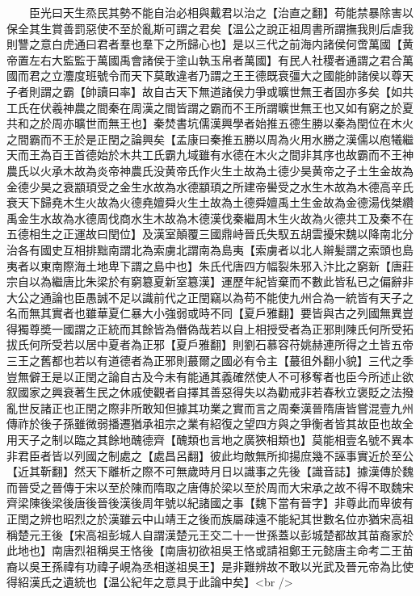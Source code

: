 　　臣光曰天生烝民其勢不能自治必相與戴君以治之【治直之翻】苟能禁暴除害以保全其生賞善罰惡使不至於亂斯可謂之君矣【温公之說正祖周書所謂撫我則后虐我則讐之意白虎通曰君者羣也羣下之所歸心也】是以三代之前海内諸侯何啻萬國【黄帝置左右大監監于萬國禹會諸侯于塗山執玉帛者萬國】有民人社稷者通謂之君合萬國而君之立灋度班號令而天下莫敢違者乃謂之王王德既衰彊大之國能帥諸侯以尊天子者則謂之霸【帥讀曰率】故自古天下無道諸侯力爭或曠世無王者固亦多矣【如共工氏在伏羲神農之間秦在周漢之間皆謂之霸而不王所謂曠世無王也又如有窮之於夏共和之於周亦曠世而無王也】秦焚書坑儒漢興學者始推五德生勝以秦為閏位在木火之間霸而不王於是正閏之論興矣【孟康曰秦推五勝以周為火用水勝之漢儒以庖犧繼天而王為百王首德始於木共工氏霸九域雖有水德在木火之間非其序也故霸而不王神農氏以火承木故為炎帝神農氏没黄帝氏作火生土故為土德少昊黄帝之子土生金故為金德少昊之衰顓頊受之金生水故為水德顓頊之所建帝嚳受之水生木故為木德高辛氏衰天下歸堯木生火故為火德堯嬗舜火生土故為土德舜嬗禹土生金故為金德湯伐桀纘禹金生水故為水德周伐商水生木故為木德漢伐秦繼周木生火故為火德共工及秦不在五德相生之正運故曰閏位】及漢室顛覆三國鼎峙晉氏失馭五胡雲擾宋魏以降南北分治各有國史互相排黜南謂北為索虜北謂南為島夷【索虜者以北人辮髪謂之索頭也島夷者以東南際海土地卑下謂之島中也】朱氏代唐四方幅裂朱邪入汴比之窮新【唐莊宗自以為繼唐比朱梁於有窮簒夏新室簒漢】運歷年紀皆棄而不數此皆私已之偏辭非大公之通論也臣愚誠不足以識前代之正閏竊以為苟不能使九州合為一統皆有天子之名而無其實者也雖華夏仁暴大小強弱或時不同【夏戶雅翻】要皆與古之列國無異豈得獨尊奬一國謂之正統而其餘皆為僭偽哉若以自上相授受者為正邪則陳氏何所受拓拔氏何所受若以居中夏者為正邪【夏戶雅翻】則劉石慕容苻姚赫連所得之土皆五帝三王之舊都也若以有道德者為正邪則蕞爾之國必有令主【蕞徂外翻小貌】三代之季豈無僻王是以正閏之論自古及今未有能通其義確然使人不可移奪者也臣今所述止欲叙國家之興衰著生民之休戚使觀者自擇其善惡得失以為勸戒非若春秋立褒貶之法撥亂世反諸正也正閏之際非所敢知但據其功業之實而言之周秦漢晉隋唐皆嘗混壹九州傳祚於後子孫雖微弱播遷猶承祖宗之業有紹復之望四方與之爭衡者皆其故臣也故全用天子之制以臨之其餘地醜德齊【醜類也言地之廣狹相類也】莫能相壹名號不異本非君臣者皆以列國之制處之【處昌呂翻】彼此均敵無所抑揚庶幾不誣事實近於至公【近其靳翻】然天下離析之際不可無歲時月日以識事之先後【識音誌】據漢傳於魏而晉受之晉傳于宋以至於陳而隋取之唐傳於梁以至於周而大宋承之故不得不取魏宋齊梁陳後梁後唐後晉後漢後周年號以紀諸國之事【魏下當有晉字】非尊此而卑彼有正閏之辨也昭烈之於漢雖云中山靖王之後而族屬疎遠不能紀其世數名位亦猶宋高祖稱楚元王後【宋高祖彭城人自謂漢楚元王交二十一世孫蓋以彭城楚都故其苗裔家於此地也】南唐烈祖稱吳王恪後【南唐初欲祖吳王恪或請祖鄭王元懿唐主命考二王苗裔以吳王孫禕有功禕子峴為丞相遂祖吳王】是非難辨故不敢以光武及晉元帝為比使得紹漢氏之遺統也【温公紀年之意具于此論中矣】<br />
